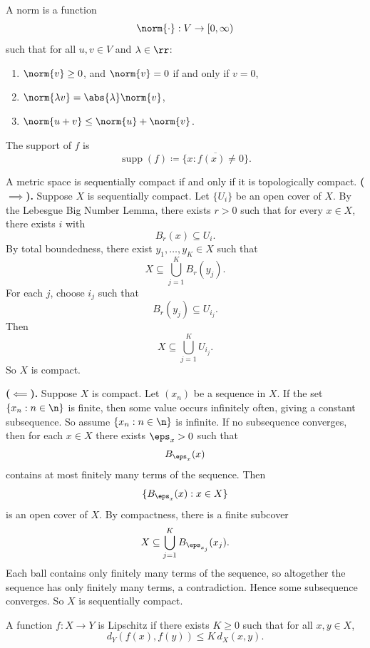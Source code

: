 \begin{definition}[Norm]
	A norm is a function
	\[
		\norm{\cdot}:V\to[0,\infty)
	\]
	such that for all $u,v\in V$ and $\lambda\in\rr$:
	\begin{enumerate}
		\item $\norm{v}\geq 0$, and $\norm{v}=0$ if and only if $v=0$,
		\item $\norm{\lambda v} = \abs{\lambda}\norm{v}$,
		\item $\norm{u+v}\leq \norm{u}+\norm{v}$.
	\end{enumerate}

\end{definition}

\begin{definition}[Support of $f$]
	The support of $f$ is
	\[
		\operatorname{supp}(f)\coloneqq \overline{\{x:f(x)\neq 0\}}.
	\]
\end{definition}

\begin{theorem}{
	A metric space is sequentially compact if and only if it is topologically compact.
}
	\textbf{($\implies$).}
	Suppose $X$ is sequentially compact.
	Let $\{U_i\}$ be an open cover of $X$.
	By the Lebesgue Big Number Lemma, there exists $r>0$ such that for every $x\in X$, there exists $i$ with
	\[
		B_r(x)\subseteq U_i.
	\]
	By total boundedness, there exist $y_1,\ldots,y_K\in X$ such that
	\[
		X\subseteq \bigcup_{j=1}^K B_r(y_j).
	\]
	For each $j$, choose $i_j$ such that
	\[
		B_r(y_j)\subseteq U_{i_j}.
	\]
	Then
	\[
		X\subseteq \bigcup_{j=1}^K U_{i_j}.
	\]
	So $X$ is compact.

	\textbf{($\impliedby$).}
	Suppose $X$ is compact.
	Let $(x_n)$ be a sequence in $X$.
	If the set $\{x_n:n\in\n\}$ is finite, then some value occurs infinitely often, giving a constant subsequence.
	So assume $\{x_n:n\in\n\}$ is infinite.
	If no subsequence converges, then for each $x\in X$ there exists $\eps_x>0$ such that
	\[
		B_{\eps_x}(x)
	\]
	contains at most finitely many terms of the sequence.
	Then
	\[
		\{B_{\eps_x}(x):x\in X\}
	\]
	is an open cover of $X$.
	By compactness, there is a finite subcover
	\[
		X\subseteq \bigcup_{j=1}^K B_{\eps_{x_j}}(x_j).
	\]
	Each ball contains only finitely many terms of the sequence, so altogether the sequence has only finitely many terms, a contradiction.
	Hence some subsequence converges.
	So $X$ is sequentially compact.
\end{theorem}

\begin{definition}[Lipschitz]
	A function $f:X\to Y$ is Lipschitz if there exists $K\geq 0$ such that for all $x,y\in X$,
	\[
		d_Y(f(x),f(y))\leq K\,d_X(x,y).
	\]
\end{definition}

